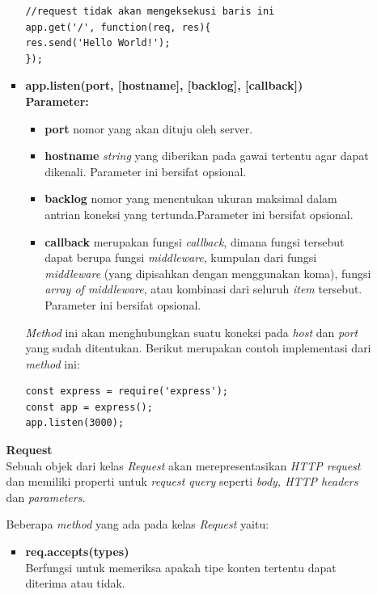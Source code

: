 \documentclass[a4paper,twoside]{article}
\begin{document}
\begin{enumerate}
\begin{enumerate}
\begin{itemize}
\begin{lstlisting}
//request tidak akan mengeksekusi baris ini
app.get('/', function(req, res){
res.send('Hello World!');
});
\end{lstlisting}
				
				\item \textbf{app.listen(port, [hostname], [backlog], [callback])} \\ \textbf{Parameter:}
				\begin{itemize}
					\item \textbf{port} nomor yang akan dituju oleh server.
					\item \textbf{hostname} \textit{string} yang diberikan pada gawai tertentu agar dapat dikenali. Parameter ini bersifat opsional.
					\item \textbf{backlog} nomor yang menentukan ukuran maksimal dalam antrian koneksi yang tertunda.Parameter ini bersifat opsional.
					\item \textbf{callback} merupakan fungsi \textit{callback}, dimana fungsi tersebut dapat berupa fungsi \textit{middleware}, kumpulan dari fungsi \textit{middleware} (yang dipisahkan dengan menggunakan koma), fungsi \textit{array of middleware}, atau kombinasi dari seluruh \textit{item} tersebut. Parameter ini bersifat opsional.
				\end{itemize}
				
				\textit{Method} ini akan menghubungkan suatu koneksi pada \textit{host} dan \textit{port} yang sudah ditentukan. Berikut merupakan contoh implementasi dari \textit{method} ini:
\begin{lstlisting}
const express = require('express');
const app = express();
app.listen(3000);
\end{lstlisting}
				
			\end{itemize}
			
			
			\textbf{Request} \\
			Sebuah objek dari kelas \textit{Request} akan merepresentasikan \textit{HTTP request} dan memiliki properti untuk \textit{request query} seperti \textit{body, HTTP headers} dan \textit{parameters}.
			
			Beberapa \textit{method} yang ada pada kelas \textit{Request} yaitu: 
			\begin{itemize}
				\item \textbf{req.accepts(types)} \\ Berfungsi untuk memeriksa apakah tipe konten tertentu dapat diterima atau tidak.
				

\end{itemize}
\end{enumerate}
\end{enumerate}
\end{document}
